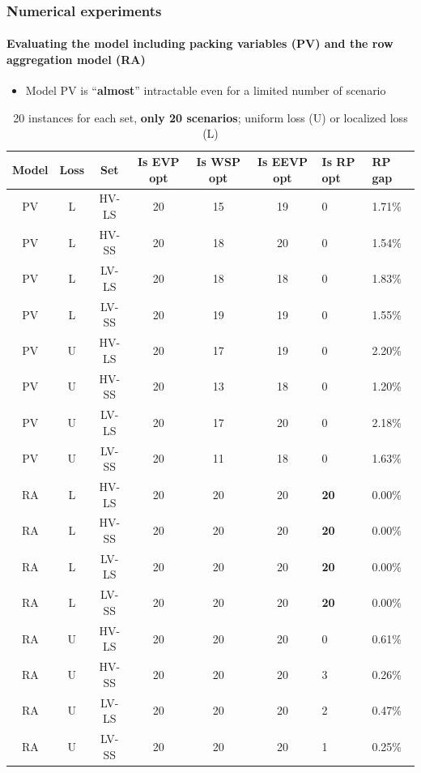 \documentclass[,9pt,xcolor={dvipsnames}]{beamer} %
\begin{document}
\begin{frame}%
	\frametitle{Numerical experiments}
	\framesubtitle{Evaluating the model including packing variables (PV) and the row aggregation model (RA)}
	\begin{itemize}
		\item Model PV is ``\textbf{almost}'' intractable even for a limited number of scenario
	\end{itemize}
	\bigskip
	\begin{table}[h!]
		\centering
		\footnotesize
		\begin{tabular}{c c c c c c k f}
			\hline
			\textbf{Model} & 
			\textbf{Loss} & 
			\textbf{Set} & 
			\textbf{Is EVP opt} & 
			\textbf{Is WSP opt} & 
			\textbf{Is EEVP opt} &
			\textbf{Is RP opt} & 
			\textbf{RP gap} \\
			\hline
			PV & L & HV-LS & 20 & 15 & 19 & 0 & 1.71\% \\
			PV & L & HV-SS & 20 & 18 & 20 & 0 & 1.54\% \\
			PV & L & LV-LS & 20 & 18 & 18 & 0 & 1.83\% \\
			PV & L & LV-SS & 20 & 19 & 19 & 0 & 1.55\% \\
			\hline
			PV & U & HV-LS & 20 & 17 & 19 & 0 & 2.20\% \\
			PV & U & HV-SS & 20 & 13 & 18 & 0 & 1.20\% \\
			PV & U & LV-LS & 20 & 17 & 20 & 0 & 2.18\% \\
			PV & U & LV-SS & 20 & 11 & 18 & 0 & 1.63\% \\
			\hline
			RA & L & HV-LS & 20 & 20 & 20 & \textbf{20} & 0.00\% \\
			RA & L & HV-SS & 20 & 20 & 20 & \textbf{20} & 0.00\% \\
			RA & L & LV-LS & 20 & 20 & 20 & \textbf{20} & 0.00\% \\
			RA & L & LV-SS & 20 & 20 & 20 & \textbf{20} & 0.00\% \\
			\hline
			RA & U & HV-LS & 20 & 20 & 20 & 0 & 0.61\% \\
			RA & U & HV-SS & 20 & 20 & 20 & 3 & 0.26\% \\
			RA & U & LV-LS & 20 & 20 & 20 & 2 & 0.47\% \\
			RA & U & LV-SS & 20 & 20 & 20 & 1 & 0.25\% \\
			\hline
		\end{tabular}
		\caption{20 instances for each set, \textbf{only 20 scenarios}; uniform loss (U) or localized loss (L)}
		\label{tab:optres}
	\end{table}
\end{frame}
\end{document}
